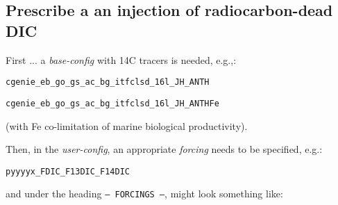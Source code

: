 \documentclass[10pt,twoside]{article}
\begin{document}
\subsection{Prescribe a an injection of radiocarbon-dead DIC}\label{Prescribe a an injection of radiocarbon-dead DIC}

First ... a \textit{base-config} with 14C tracers is needed, e.g.,:
\vspace{-10pt}\begin{verbatim}
cgenie_eb_go_gs_ac_bg_itfclsd_16l_JH_ANTH
\end{verbatim}\vspace{-10pt}
\vspace{-10pt}\begin{verbatim}
cgenie_eb_go_gs_ac_bg_itfclsd_16l_JH_ANTHFe
\end{verbatim}\vspace{-10pt}
(with Fe co-limitation of marine biological productivity).

Then, in the \textit{user-config}, an appropriate \textit{forcing} needs to be specified, e.g.:
\vspace{-10pt}\begin{verbatim}
pyyyyx_FDIC_F13DIC_F14DIC
\end{verbatim}\vspace{-10pt}
and under the heading \texttt{--- FORCINGS ---}, might look something like:
 
\end{document}
